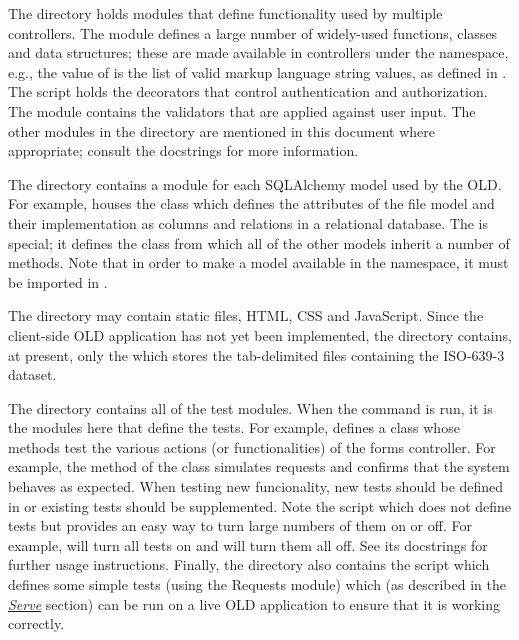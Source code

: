 \documentclass[letterpaper,10pt,english]{sphinxmanual}
\begin{document}
The  directory holds modules that define functionality used by multiple
controllers.  The  module defines a large number of widely-used
functions, classes and data structures; these are made available in controllers
under the  namespace, e.g., the value of  is the list
of valid markup language string values, as defined in .  The
 script holds the decorators that control authentication and
authorization.  The  module contains the validators that are
applied against user input.  The other modules in the  directory are
mentioned in this document where appropriate; consult the docstrings for more
information.

The  directory contains a module for each SQLAlchemy model used by the
OLD.  For example,  houses the  class which defines the
attributes of the file model and their implementation as columns and relations
in a relational database.  The  is special; it defines the
 class from which all of the other models inherit a number of methods.
Note that in order to make a model available in the
 namespace, it must be imported in
.

The  directory may contain static files, HTML, CSS and JavaScript.
Since the client-side OLD application has not yet been implemented, the
 directory contains, at present, only the 
which stores the tab-delimited files containing the ISO-639-3 dataset.

The  directory contains all of the test modules.  When the
 command is run, it is the modules here that define the tests.  For
example,  defines a 
class whose methods test the various actions (or functionalities) of the forms
controller.  For example, the  method of the
 class simulates  requests and confirms
that the system behaves as expected.  When testing new funcionality, new tests
should be defined in  or existing tests should be
supplemented.  Note the  script which does not define tests
but provides an easy way to turn large numbers of them on or off.  For example,
 will turn
all tests on and
 will turn
them all off.  See its docstrings for further usage instructions.  Finally, the
 directory also contains the  script which
defines some simple tests (using the Requests module) which (as described in the
{\hyperref[installation:serve]{\emph{Serve}}} section) can be run on a live OLD application to ensure that it is
working correctly.
\end{document}
